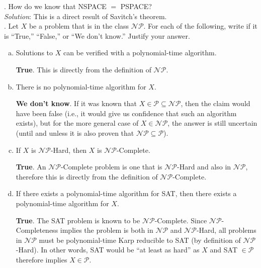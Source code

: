 \documentclass{scrartcl}
\begin{document}
    \bigskip
    . How do we know that \textsf{NSPACE $=$ PSPACE}?\\

    \noindent
    \textit{Solution}: This is a direct result of Savitch's theorem.\\

    \bigskip
    . Let $X$ be a problem that is in the class $\mathcal{NP}$. For each of the following, write if
    it is ``True,'' ``False,'' or ``We don't know.'' Justify your answer.
    \begin{enumerate}[(a)]
        \item Solutions to $X$ can be verified with a polynomial-time algorithm.

            \textbf{True}. This is directly from the definition of $\mathcal{NP}$.

        \item There is no polynomial-time algorithm for $X$.

            \textbf{We don't know}. If it was known that $X \in \mathcal{P} \subseteq \mathcal{NP}$,
            then the claim would have been false (i.e., it would give us confidence that such an
            algorithm exists), but for the more general case of $X \in \mathcal{NP}$, the answer is
            still uncertain (until and unless it is also proven that $\mathcal{NP} \subseteq
            \mathcal{P}$).

        \item If $X$ is $\mathcal{NP}$-Hard, then $X$ is $\mathcal{NP}$-Complete.

            \textbf{True}. An $\mathcal{NP}$-Complete problem is one that is $\mathcal{NP}$-Hard and
            also in $\mathcal{NP}$, therefore this is directly from the definition of
            $\mathcal{NP}$-Complete.

        \item If there exists a polynomial-time algorithm for SAT, then there exists a
            polynomial-time algorithm for $X$.

            \textbf{True}. The SAT problem is known to be $\mathcal{NP}$-Complete. Since
            $\mathcal{NP}$-Completeness implies the problem is both in $\mathcal{NP}$ and
            $\mathcal{NP}$-Hard, all problems in $\mathcal{NP}$ must be polynomial-time Karp
            reducible to SAT (by definition of $\mathcal{NP}$-Hard). In other words, SAT would be
            ``at least as hard'' as $X$ and SAT $\in \mathcal{P}$ therefore implies $X \in
            \mathcal{P}$.
    \end{enumerate}
\end{document}
